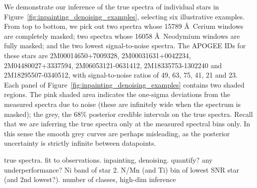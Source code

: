 \documentclass[a4paper,fleqn,usenatbib]{mnras}
\begin{document}
We demonstrate our inference of the true spectra of individual stars in Figure~\ref{fig:inpainting_denoising_examples}, selecting six illustrative examples. From top to bottom, we pick out two spectra whose 15789 \AA\ Cerium windows are completely masked; two spectra whose 16058 \AA\ Neodymium windows are fully masked; and the two lowest signal-to-noise spectra. The APOGEE IDs for these stars are 2M00014650+7009328, 2M00031631+0042234, 2M04480027+3337594, 2M06053121-0631412, 2M18335753-1302240 and 2M18295507-0340512, with signal-to-noise ratios of 49, 63, 75, 41, 21 and 23. Each panel of Figure~\ref{fig:inpainting_denoising_examples} contains two shaded regions. The pink shaded area indicates the one-sigma deviations from the measured spectra due to noise (these are infinitely wide when the spectrum is masked); the grey, the 68\% posterior credible intervals on the true spectra. Recall that we are inferring the true spectra only at the measured spectral bins only. In this sense the smooth grey curves are perhaps misleading, as the posterior uncertainty is strictly infinite between datapoints.
 
true spectra. fit to observations. inpainting, denoising. quantify? any underperformance? Ni band of star 2. N/Mn (and Ti) bin of lowest SNR star (and 2nd lowest?).
number of classes, high-dim inference
\end{document}

